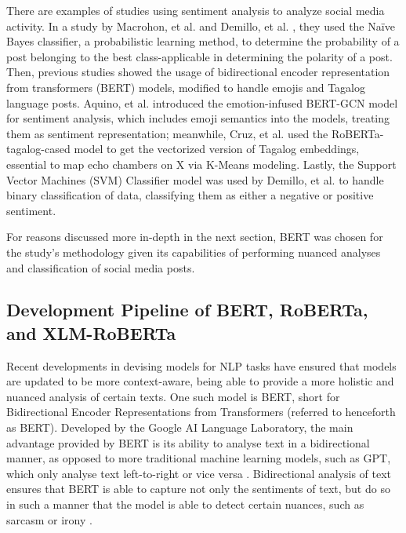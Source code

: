 There are examples of studies using sentiment analysis to analyze social media activity. In a study by Macrohon, et al. \cite{Macrohon-2022} and Demillo, et al. \cite{Demillo-2023}, they used the Naïve Bayes classifier, a probabilistic learning method, to determine the probability of a post belonging to the best class-applicable in determining the polarity of a post. Then, previous studies showed the usage of bidirectional encoder representation from transformers (BERT) models, modified to handle emojis and Tagalog language posts. Aquino, et al. \cite{Aquino-2025} introduced the emotion-infused BERT-GCN model for sentiment analysis, which includes emoji semantics into the models, treating them as sentiment representation; meanwhile, Cruz, et al. \cite{Cruz-2022} used the RoBERTa-tagalog-cased model to get the vectorized version of Tagalog embeddings, essential to map echo chambers on X via K-Means modeling. Lastly, the Support Vector Machines (SVM) Classifier model was used by Demillo, et al. \cite{Demillo-2023} to handle binary classification of data, classifying them as either a negative or positive sentiment.

For reasons discussed more in-depth in the next section, BERT was chosen for the study’s methodology given its capabilities of performing nuanced analyses and classification of social media posts.

\subsection{Development Pipeline of BERT, RoBERTa, and XLM-RoBERTa}
Recent developments in devising models for NLP tasks have ensured that models are updated to be more context-aware, being able to provide a more holistic and nuanced analysis of certain texts. One such model is BERT, short for Bidirectional Encoder Representations from Transformers (referred to henceforth as BERT). Developed by the Google AI Language Laboratory, the main advantage provided by BERT is its ability to analyse text in a bidirectional manner, as opposed to more traditional machine learning models, such as GPT, which only analyse text left-to-right or vice versa \cite{Koroteev-2021}. Bidirectional analysis of text ensures that BERT is able to capture not only the sentiments of text, but do so in such a manner that the model is able to detect certain nuances, such as sarcasm or irony \cite{Dong-2020}.

